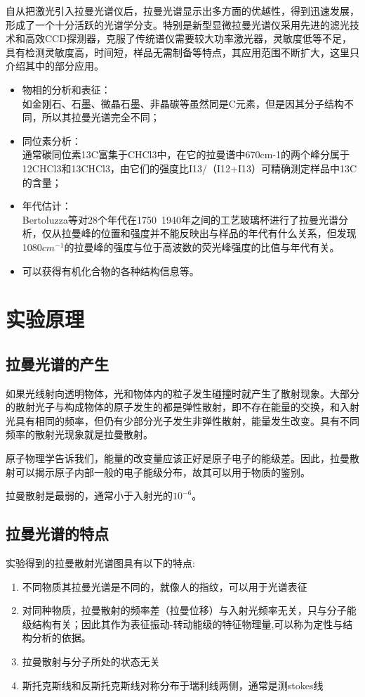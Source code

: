 \documentclass[hyperref]{ctexart}
\begin{document}
\begin{multicols}{2}
		自从把激光引入拉曼光谱仪后，拉曼光谱显示出多方面的优越性，得到迅速发展，形成了一个十分活跃的光谱学分支。特别是新型显微拉曼光谱仪采用先进的滤光技术和高效CCD探测器，克服了传统谱仪需要较大功率激光器，灵敏度低等不足，具有检测灵敏度高，时间短，样品无需制备等特点，其应用范围不断扩大，这里只介绍其中的部分应用。
		
		\begin{itemize}
			\item	物相的分析和表征：\\
			如金刚石、石墨、微晶石墨、非晶碳等虽然同是C元素，但是因其分子结构不同，所以其拉曼光谱完全不同；
			\item	同位素分析：\\
			通常碳同位素13C富集于CHCl3中，在它的拉曼谱中670cm-1的两个峰分属于12CHCl3和13CHCl3，由它们的强度比I13/（I12+I13）可精确测定样品中13C的含量；
			\item	年代估计：\\
			Bertoluzza等对28个年代在1750~1940年之间的工艺玻璃杯进行了拉曼光谱分析，仅从拉曼峰的位置和强度并不能反映出与样品的年代有什么关系，但发现1080$cm^{-1}$的拉曼峰的强度与位于高波数的荧光峰强度的比值与年代有关。
			\item	可以获得有机化合物的各种结构信息等。
		\end{itemize}
		
		\section{实验原理}
		\subsection{拉曼光谱的产生}
		如果光线射向透明物体，光和物体内的粒子发生碰撞时就产生了散射现象。大部分的散射光子与构成物体的原子发生的都是弹性散射，即不存在能量的交换，和入射光具有相同的频率，但仍有少部分光子发生非弹性散射，能量发生改变。具有不同频率的散射光现象就是拉曼散射。
		
		原子物理学告诉我们，能量的改变量应该正好是原子电子的能级差。因此，拉曼散射可以揭示原子内部一般的电子能级分布，故其可以用于物质的鉴别。
		
		拉曼散射是最弱的，通常小于入射光的$10^{-6}$。
		
		\subsection{拉曼光谱的特点}
		实验得到的拉曼散射光谱图具有以下的特点:
		\begin{enumerate}
			\item	不同物质其拉曼光谱是不同的，就像人的指纹，可以用于光谱表征
			\item	对同种物质，拉曼散射的频率差（拉曼位移）与入射光频率无关，只与分子能级结构有关；因此其作为表征振动-转动能级的特征物理量,可以称为定性与结构分析的依据。
			\item	拉曼散射与分子所处的状态无关
			\item	斯托克斯线和反斯托克斯线对称分布于瑞利线两侧，通常是测stokes线
		\end{enumerate}
	

\end{multicols}
\end{document}
